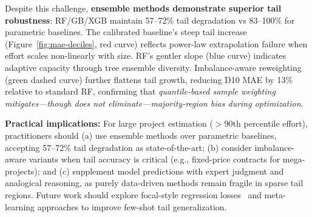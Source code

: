 \documentclass{ieeeaccess}
\begin{document}
Despite this challenge, \textbf{ensemble methods demonstrate superior tail robustness}: RF/GB/XGB maintain 57--72\% tail degradation vs 83--100\% for parametric baselines. The calibrated baseline's steep tail increase (Figure~\ref{fig:mae-deciles}, red curve) reflects power-law extrapolation failure when effort scales non-linearly with size. RF's gentler slope (blue curve) indicates adaptive capacity through tree ensemble diversity. Imbalance-aware reweighting (green dashed curve) further flattens tail growth, reducing D10 MAE by 13\% relative to standard RF, confirming that \textit{quantile-based sample weighting mitigates—though does not eliminate—majority-region bias during optimization}.

\textbf{Practical implications:} For large project estimation ($>$90th percentile effort), practitioners should (a) use ensemble methods over parametric baselines, accepting 57--72\% tail degradation as state-of-the-art; (b) consider imbalance-aware variants when tail accuracy is critical (e.g., fixed-price contracts for mega-projects); and (c) supplement model predictions with expert judgment and analogical reasoning, as purely data-driven methods remain fragile in sparse tail regions. Future work should explore focal-style regression losses~\cite{lin2017focal} and meta-learning approaches to improve few-shot tail generalization.
\end{document}
